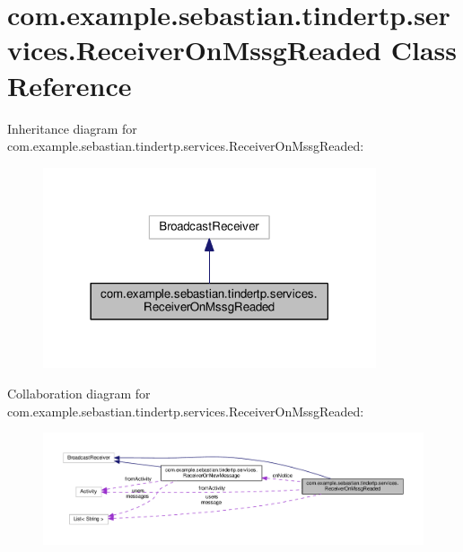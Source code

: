 \hypertarget{classcom_1_1example_1_1sebastian_1_1tindertp_1_1services_1_1ReceiverOnMssgReaded}{}\section{com.\+example.\+sebastian.\+tindertp.\+services.\+Receiver\+On\+Mssg\+Readed Class Reference}
\label{classcom_1_1example_1_1sebastian_1_1tindertp_1_1services_1_1ReceiverOnMssgReaded}


Inheritance diagram for com.\+example.\+sebastian.\+tindertp.\+services.\+Receiver\+On\+Mssg\+Readed\+:\nopagebreak
\begin{figure}[H]
\begin{center}
\leavevmode
\includegraphics[width=278pt]{classcom_1_1example_1_1sebastian_1_1tindertp_1_1services_1_1ReceiverOnMssgReaded__inherit__graph}
\end{center}
\end{figure}


Collaboration diagram for com.\+example.\+sebastian.\+tindertp.\+services.\+Receiver\+On\+Mssg\+Readed\+:\nopagebreak
\begin{figure}[H]
\begin{center}
\leavevmode
\includegraphics[width=350pt]{classcom_1_1example_1_1sebastian_1_1tindertp_1_1services_1_1ReceiverOnMssgReaded__coll__graph}
\end{center}
\end{figure}

